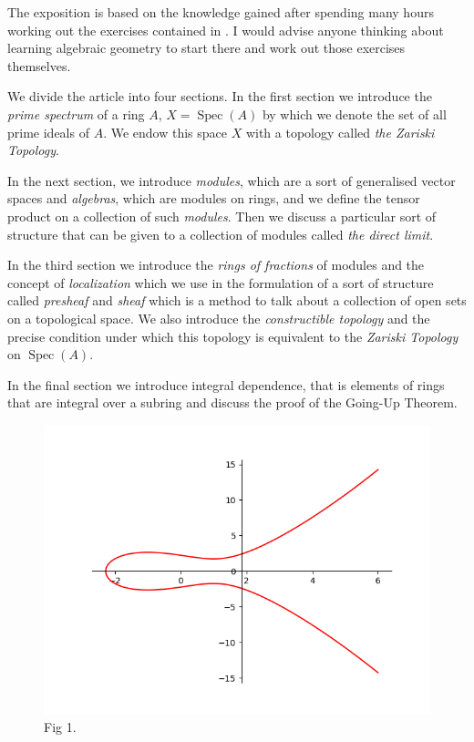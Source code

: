 \documentclass[]{report}
\DeclareMathOperator\Spec{Spec}
\begin{document}
    The exposition is based on the knowledge gained after spending many hours working out the exercises contained in \cite{atiyah1}. I would advise anyone thinking about learning algebraic geometry to start there and work out those exercises themselves.  

    We divide the article into four sections. In the first section we introduce the \textit{prime spectrum} of a ring $A$, $X = \Spec(A)$ by which we denote the set of all prime ideals of $A$. We endow this space $X$ with a topology called \textit{the Zariski Topology}.

    In the next section, we introduce \textit{modules}, which are a sort of generalised vector spaces and \textit{algebras}, which are modules on rings, and we define the tensor product on a collection of such \textit{modules}. Then we discuss a particular sort of structure that can be given to a collection of modules called \textit{the direct limit}.

    In the third section we introduce the \textit{rings of fractions} of modules and the concept of \textit{localization} which we use in the formulation of a sort of structure called \textit{presheaf} and \textit{sheaf} which is a method to talk about a collection of open sets on a topological space. We also introduce the \textit{constructible topology} and the precise condition under which this topology is equivalent to the \textit{Zariski Topology} on $\Spec(A)$. 

    In the final section we introduce integral dependence, that is elements of rings that are integral over a subring and discuss the proof of the Going-Up Theorem.


\begin{figure}
  \includegraphics[width=\linewidth]{img/ell_curv1.png}
  \caption{Fig 1.}
  \label{fig:ell_curv1}
\end{figure}
\end{document}
